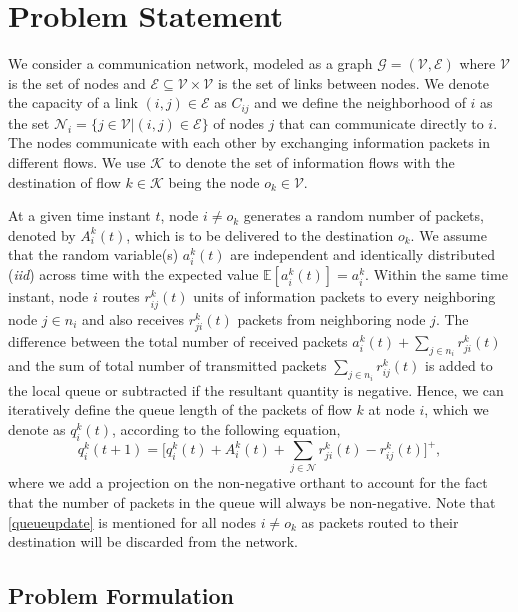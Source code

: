\documentclass[lettersize,journal]{IEEEtran}
\begin{document}
\section{Problem Statement} \label{sec:problem}
We consider a communication network, modeled as a graph $\mathcal{G} = (\mathcal{V, E})$ where $\mathcal{V}$ is the set of nodes and $\mathcal{E} \subseteq \mathcal{V} \times \mathcal{V}$ is the set of links between nodes. We denote the capacity of a link $(i,j) \in \mathcal{E}$ as $C_{ij}$ and we define the neighborhood of $i$ as the set $\mathcal{N}_i = \{j \in \mathcal{V} | (i,j) \in \mathcal{E} \}$ of nodes $j$ that can communicate directly to $i$. The nodes communicate with each other by exchanging information packets in different flows. We use $\mathcal{K}$ to denote the set of information flows with the destination of flow $k \in \mathcal{K}$ being the node $o_k \in \mathcal{V}$.

At a given time instant $t$, node $i\neq o_k $ generates a random number of packets, denoted by $A_i^k(t)$, which is to be delivered to the destination $o_k$. We assume that the random variable(s) $a_i^k(t)$ are independent and identically distributed (\textit{iid}) across time with the expected value $\mathbb{E}[a_i^k(t)]=a_i^k$. Within the same time instant, node $i$ routes $r_{ij}^k(t)$ units of information packets to every neighboring node $j \in n_i$ and also receives $r_{ji}^k(t)$ packets from neighboring node $j$. The difference between the total number of received packets $a_i^k(t) + \sum_{j \in n_i} r_{ji}^k(t)$ and the sum of total number of transmitted packets $\sum_{j \in n_i} r_{ij}^k(t)$ is added to the local queue or subtracted if the resultant quantity is negative. Hence, we can iteratively define the queue length of the packets of flow $k$ at node $i$, which we denote as $q_i^k(t)$, according to the following equation,
\begin{equation} \label{queueupdate}
    q_i^k(t+1) = \Bigr[q_i^k(t) + A_i^k(t) + \sum_{j \in \mathcal{N}} r_{ji}^k(t) - r_{ij}^k(t) \Bigr]^+,  
\end{equation}
where we add a projection on the non-negative orthant to account for the fact that the number of packets in the queue will always be non-negative. Note that \eqref{queueupdate} is mentioned for all nodes $i\neq o_k $ as packets routed to their destination will be discarded from the network.

\subsection{Problem Formulation}
\label{ssec:problem_subhead}
\end{document}
